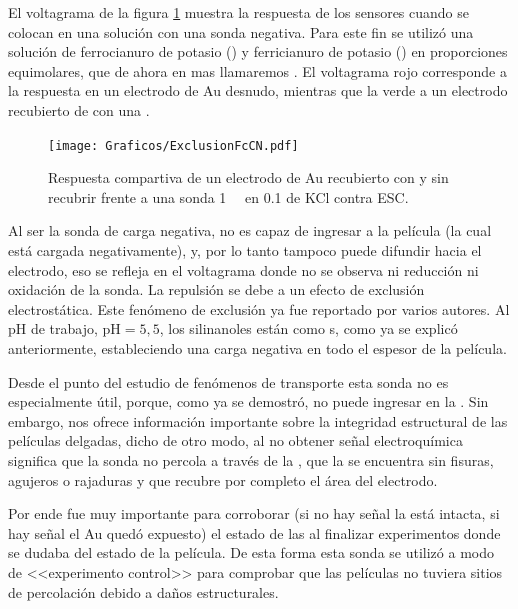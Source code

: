 	 El voltagrama de la figura \ref{fig:exclusion_vs_Au} muestra la respuesta de los sensores cuando se colocan en una solución con una sonda negativa. Para este fin se utilizó una solución de ferrocianuro de potasio (\ferroCompleto) y ferricianuro de potasio (\ferriCompleto) en proporciones equimolares, que de ahora en mas llamaremos \fe. El voltagrama rojo corresponde a la respuesta en un electrodo de Au desnudo, mientras que la verde a un electrodo recubierto de con una \pdm.
	
			\begin{figure}[ht]
				\centering
		 	    \texttt{[image: Graficos/ExclusionFcCN.pdf]}
		        \caption[Exclusión electrostática en \pdmF]{Respuesta compartiva de un electrodo de Au recubierto con \pdmF\space y sin recubrir frente a una sonda \fe\space \SI{1}{\milli\Molar} en \SI{0.1}{\Molar} de KCl contra ESC.}
		        \label{fig:exclusion_vs_Au}
		      	\end{figure}
	
	 Al ser la sonda de carga negativa, no es capaz de ingresar a la película (la cual está cargada negativamente), y, por lo tanto tampoco puede difundir hacia el electrodo, eso se refleja en el voltagrama donde no se observa ni reducción ni oxidación de la sonda. La repulsión se debe a un efecto de exclusión electrostática. Este fenómeno de exclusión ya fue reportado por varios autores\cite{alberti2015,schmuhl2005,Andrieu-Brunsen2015,brunsen2011}. Al pH de trabajo, $\text{pH}=5,5$, los silinanoles están como s, como ya se explicó anteriormente, estableciendo una carga negativa en todo el espesor de la película.

	 Desde el punto del estudio de fenómenos de  transporte esta sonda no es especialmente útil, porque, como ya se demostró, no puede ingresar en la \pdm. Sin embargo, nos ofrece información importante sobre la integridad estructural de las películas delgadas, dicho de otro modo, al no obtener señal electroquímica significa que la sonda no percola a través de la \pdm, que la \pdm\space se encuentra sin fisuras, agujeros o rajaduras y que recubre por completo el área del electrodo.

	 Por ende fue muy importante para corroborar (si no hay señal la \pdm está intacta, si hay señal el Au quedó expuesto) el estado de las \pdm\space al finalizar experimentos donde se dudaba del estado de la película.  De esta forma esta sonda se utilizó a modo de <<experimento control>> para comprobar que las películas no tuviera sitios de percolación debido a daños estructurales.

